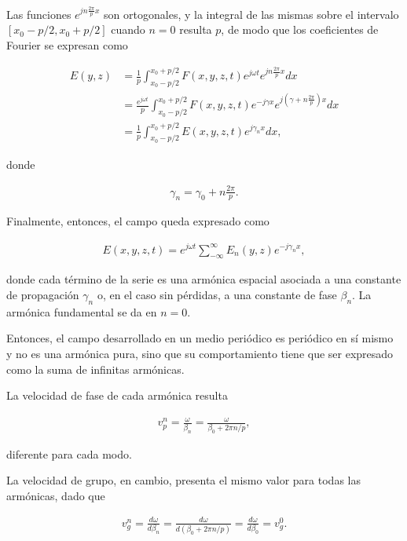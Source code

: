 Las funciones $e^{jn\frac{2\pi}{p}x}$ son ortogonales, y la integral de las mismas sobre el intervalo $[x_0-p/2, x_0+p/2]$ cuando $n = 0$ resulta $p$, de modo que los coeficientes de Fourier se expresan como

\begin{align}
E(y,z) &= \frac{1}{p} \int_{x_0-p/2}^{x_0+p/2} F(x,y,z,t) e^{j\omega t} e^{j n \frac{2\pi}{p} x} dx \\
&= \frac{e^{j\omega t}}{p} \int_{x_0-p/2}^{x_0+p/2} F(x,y,z,t) e^{-j\gamma x} e^{j \left(\gamma + n \frac{2\pi}{p}\right) x} dx \\
&= \frac{1}{p} \int_{x_0-p/2}^{x_0+p/2} E(x,y,z,t) e^{j \gamma_n x} dx,
\end{align}

donde

\begin{align}
	\label{eq:relacion_gamma-n-gamma-0}
	\gamma_n = \gamma_0 + n \frac{2\pi}{p}.
\end{align}

Finalmente, entonces, el campo queda expresado como

\begin{align}
E(x,y,z,t) = e^{j\omega t} \sum_{-\infty}^{\infty} E_n(y,z) e^{-j\gamma_n x},
\end{align}

donde cada término de la serie es una armónica espacial asociada a una constante de propagación $\gamma_n$ o, en el caso sin pérdidas, a una constante de fase $\beta_n$. La armónica fundamental se da en $n=0$.

Entonces, el campo desarrollado en un medio periódico es periódico en sí mismo y no es una armónica pura, sino que su comportamiento tiene que ser expresado como la suma de infinitas armónicas.

La velocidad de fase de cada armónica resulta %

\begin{align}
v_p^n = \frac{\omega}{\beta_n} = \frac{\omega}{\beta_0 + 2\pi n/p},
\end{align}

diferente para cada modo.

La velocidad de grupo, en cambio, presenta el mismo valor para todas las armónicas, dado que

\begin{align}
v_g^n = \frac{d\omega}{d\beta_n} = \frac{d\omega}{d(\beta_0 +2\pi n/p)} = \frac{d\omega}{d\beta_0} = v_g^0.
\end{align}

